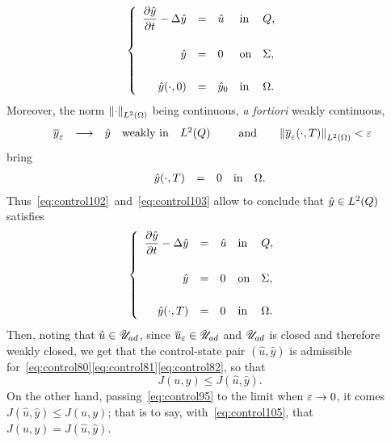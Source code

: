 \ie{}
\begin{equation}\label{eq:control102}
    \begin{cases}\displaystyle
        \begin{array}{rclll}
            \dfrac{\partial{}\hat{y}}{\partial{}t} - \Delta\hat{y} & = & \hat{u} &
            \text{in} & Q,\\
            \\
            \hat{y} & = & 0 & \text{on} & \Sigma,\\
            \\
            {\hat{y}}\!\left({\cdot, 0}\right) & = & {\hat{y}}_{0} & \text{in} &
            \Omega.
        \end{array}
    \end{cases}
\end{equation}
Moreover, the norm ${\left\|{\cdot }\right\|}_{L^{2}\left({\Omega}\right)}$ being continuous, \textit{a fortiori}
weakly continuous,
\begin{equation*}
    \begin{array}{rclll}
        {\overline{y}}_{\varepsilon} & \longrightarrow & \hat{y} & \text{weakly in} &
        L^{2}\!\left({Q}\right)
    \end{array}\qquad\text{and}\qquad
    {\left\|{ { {\overline{y}}_{\varepsilon} }\!\left({\cdot,T}\right)  }\right\|}_{L^{2}\left({\Omega}\right)} < \varepsilon
\end{equation*}
bring
\begin{equation}\label{eq:control103}
    \begin{array}{rclll}
        {\hat{y}}\!\left({\cdot,T}\right) & = & 0 & \text{in} & \Omega.
    \end{array}
\end{equation}
Thus~\eqref{eq:control102}~and~\eqref{eq:control103} allow to conclude that
$\hat{y}\in L^{2}\!\left({Q}\right)$ satisfies
\begin{equation*}
    \begin{cases}\displaystyle
        \begin{array}{rclll}
            \dfrac{\partial{}\hat{y}}{\partial{}t} - \Delta\hat{y} & = & \hat{u} &
            \text{in} & Q,\\
            \\
            \hat{y} & = & 0 & \text{on} & \Sigma,\\
            \\
            {\hat{y}}\!\left({\cdot,T}\right) & = & 0 & \text{in} & \Omega.
        \end{array}
    \end{cases}
\end{equation*}
Then, noting that $\hat{u}\in{\mathscr{U}}_{ad}$, since ${\overline{u}}_{\varepsilon}\in{\mathscr{U}}_{ad}$ and ${\mathscr{U}}_{ad}$ is
closed and therefore weakly closed, we get that the control-state pair
$\left({\hat{u},\hat{y}}\right)$ is admissible
for~\eqref{eq:control80}\eqref{eq:control81}\eqref{eq:control82}, so that
\begin{equation}\label{eq:control105}
    J(u,y)\leq J\!\left({\hat{u},\hat{y}}\right).
\end{equation}
On the other hand, passing~\eqref{eq:control95} to the limit when $\varepsilon\to
0$, it comes $J\!\left({\hat{u},\hat{y}}\right)\leq J(u,y)$; that is to
say, with~\eqref{eq:control105}, that $J(u,y) =
J\!\left({\hat{u},\hat{y}}\right)$.

